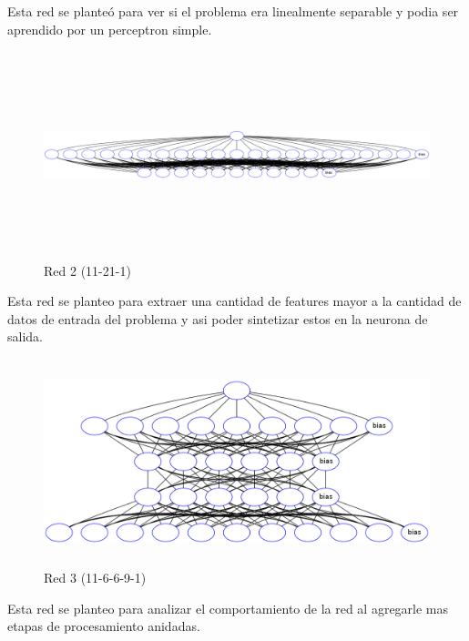 Esta red se planteó para ver si el problema era linealmente separable y podia ser aprendido por un perceptron simple.

\begin{figure}[H]
  \includegraphics[width=16cm, height=6cm]{../plot/11-21-1.png}
  \centering
  \caption{Red 2 (11-21-1)}
\end{figure}

Esta red se planteo para extraer una cantidad de features mayor a la cantidad de datos de entrada del problema y asi poder sintetizar estos en la neurona de salida.

\begin{figure}[H]
  \includegraphics[width=12cm, height=6cm]{../plot/11-6-6-9-1.png}
  \centering
  \caption{Red 3 (11-6-6-9-1)}
\end{figure}

Esta red se planteo para analizar el comportamiento de la red al agregarle mas etapas de procesamiento anidadas.

